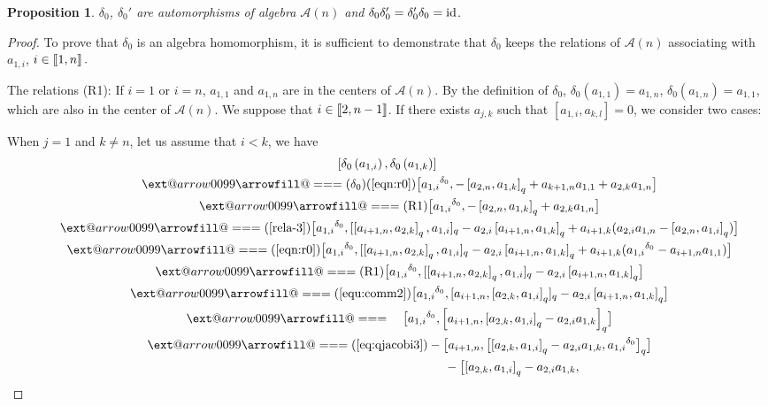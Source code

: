 \documentclass[10pt,a4paper]{amsart}
\makeatletter
\def\x@arrow{\DOTSB\Relbar}
\def\xlongequalsignfill@{\arrowfill@\x@arrow\Relbar\x@arrow}
\providecommand{\xlongequal}[2][]{%
	\ext@arrow 0099\xlongequalsignfill@{#1}{#2}}
\numberwithin{equation}{section}
\def\id{{\rm id}}
\def\lr#1{\left[#1\right]}
\def\lrb#1{\left(#1\right)}
\def\d{\delta}
\def\A{\mathscr{A}}
\def\lbb#1{\left[\kern-0.15em\left[ {#1} \right] \kern-0.15em\right]}
\newtheorem{Proposition}[Theorem]{Proposition}
 { \theoremstyle{definition}
\newtheorem{Definition}[Theorem]{Definition}
\newtheorem{Note}[Theorem]{Note}
\newtheorem{Example}[Theorem]{Example}
\newtheorem{Remark}[Theorem]{Remark} }
\makeatother
\begin{document}
\begin{Proposition}
$\d_0$, $\d_0' $ are automorphisms of algebra $\A(n)$ and $\d_0\d_0'=\d_0'\d_0=\id$.
\end{Proposition}
\begin{proof}
To prove that $\d_0$ is an algebra homomorphism, it is sufficient to demonstrate that $\d_0$ keeps the relations of $\A(n)$ associating with $a_{1,i}$, $i \in \lbb{1, n}.$

The relations (R1):
If $i=1$ or $i=n$, $a_{1,1}$ and $a_{1,n}$ are in the centers of $\A(n)$.
By the definition of $\d_0$, $\d_0(a_{1,1})=a_{1,n}$, $\d_0(a_{1,n})=a_{1,1}$, which are also in the center of $\A(n)$.
We suppose that $i \in \lbb{2,n-1}$.
If there exists $a_{j,k}$ such that $[a_{1,i}, a_{k,l}]=0$, we consider two cases:

When $j=1$ and $ k\neq n$, let us assume that $i<k$, we have
\begin{gather*}
 \lr{\d_0\lrb{a_{1,i}},\d_0\lrb{a_{1,k}}}\\
\qquad \xlongequal[(\d_0)]{\lrb{\ref{eqn:r0}}} \bigl[{a_{1,i}}^{\d_0}, -\lr{a_{2,n}, a_{1,k}}_q+a_{k+1,n}a_{1,1}+a_{2,k}a_{1,n}\bigr]\\
\qquad\xlongequal{\lrb{\textrm{R1}}} \bigl[{a_{1,i}}^{\d_0}, -\lr{a_{2,n}, a_{1,k}}_q+a_{2,k}a_{1,n}\bigr]\\
\qquad \xlongequal{\lrb{\ref{rela-3}}} \bigl[{a_{1,i}}^{\d_0}, [\lr{a_{i+1, n}, a_{2, k}}_q, a_{1, i}]_q -a_{2, i}\lr{a_{i+1, n}, a_{1, k}}_q +a_{i+1, k}(a_{2, i} a_{1, n}-\lr{ a_{2, n}, a_{1, i}}_q)\bigr]\\
\qquad \xlongequal{\lrb{\ref{eqn:r0}}} \bigl[{a_{1,i}}^{\d_0}, [\lr{a_{i+1, n}, a_{2, k}}_q, a_{1, i}]_q -a_{2, i}\lr{a_{i+1, n}, a_{1, k}}_q +a_{i+1, k}({a_{1,i}}^{\d_0}-a_{i+1,n}a_{1,1})\bigr]\\
\qquad \xlongequal{\lrb{\textrm{R1}}} \bigl[{a_{1,i}}^{\d_0}, [\lr{a_{i+1, n}, a_{2, k}}_q, a_{1, i}]_q -a_{2, i}\lr{a_{i+1, n}, a_{1, k}}_q \bigr]\\
\qquad \xlongequal{\lrb{\ref{equ:comm2}}} \bigl[{a_{1,i}}^{\d_0}, [a_{i+1, n}, \lr{a_{2, k}, a_{1, i}}_q]_q -a_{2, i}\lr{a_{i+1, n}, a_{1, k}}_q \bigr]\\
 \qquad\xlongequal{\quad} \bigl[{a_{1,i}}^{\d_0}, \lr{a_{i+1, n}, \lr{a_{2, k}, a_{1, i}}_q-a_{2, i}a_{1, k}}_q \bigr]\\
\qquad \xlongequal{\lrb{\ref{eq:qjacobi3}}} -\bigl[a_{i+1, n}, \bigl[\lr{a_{2, k}, a_{1, i}}_q -a_{2, i}a_{1, k}, {a_{1,i}}^{\d_0} \bigr]_q \bigr] \\
\phantom{\qquad \xlongequal{\qquad}\!\! }{} - \bigl[\lr{a_{2, k}, a_{1, i}}_q-a_{2, i}a_{1, k},

\end{gather*}
\end{proof}
\end{document}
